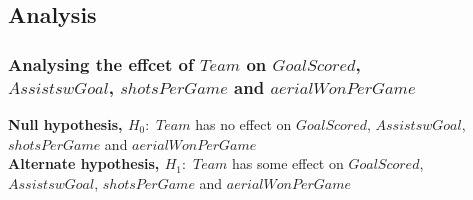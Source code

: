 \documentclass[12pt]{article}
\begin{document}
\newpage

\subsection{Analysis}
\subsubsection{Analysing the effcet of $ Team $ on $ GoalScored $, \\ $ AssistswGoal $, $ shotsPerGame $ and $ aerialWonPerGame $}

\textbf{Null hypothesis, $ H_0: $} $ Team $ has no effect on $ GoalScored $, $ AssistswGoal $, $ shotsPerGame $ and $ aerialWonPerGame $\\
\textbf{Alternate hypothesis, $ H_1: $} $ Team $ has some effect on $ GoalScored $, $ AssistswGoal $, $ shotsPerGame $ and $ aerialWonPerGame $
		
\end{document}
